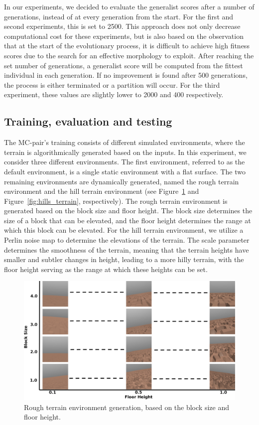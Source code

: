         In our experiments, we decided to evaluate the generalist scores after a number of generations, instead of at every generation from the start. For the first and second experiments, this is set to 2500. This approach does not only decrease computational cost for these experiments, but is also based on the observation that at the start of the evolutionary process, it is difficult to achieve high fitness scores due to the search for an effective morphology to exploit. After reaching the set number of generations, a generalist score will be computed from the fittest individual in each generation. If no improvement is found after 500 generations, the process is either terminated or a partition will occur. For the third experiment, these values are slightly lower to 2000 and 400 respectively.

    \subsection{Training, evaluation and testing}
        The MC-pair's training consists of different simulated environments, where the terrain is algorithmically generated based on the inputs. In this experiment, we consider three different environments. The first environment, referred to as the default environment, is a single static environment with a flat surface. The two remaining environments are dynamically generated, named the rough terrain environment and the hill terrain environment (see Figure~\ref{fig:rough_terrain} and Figure~\ref{fig:hills_terrain}, respectively). The rough terrain environment is generated based on the block size and floor height. The block size determines the size of a block that can be elevated, and the floor height determines the range at which this block can be elevated. For the hill terrain environment, we utilize a Perlin noise map to determine the elevations of the terrain. The scale parameter determines the smoothness of the terrain, meaning that the terrain heights have smaller and subtler changes in height, leading to a more hilly terrain, with the floor height serving as the range at which these heights can be set. 
        \begin{figure}[ht]
            \centering
            \includegraphics[width=\linewidth]{./resources/rough_terrain.png}
            \caption{Rough terrain environment generation, based on the block size and floor height.}
            \label{fig:rough_terrain}
        \end{figure}
